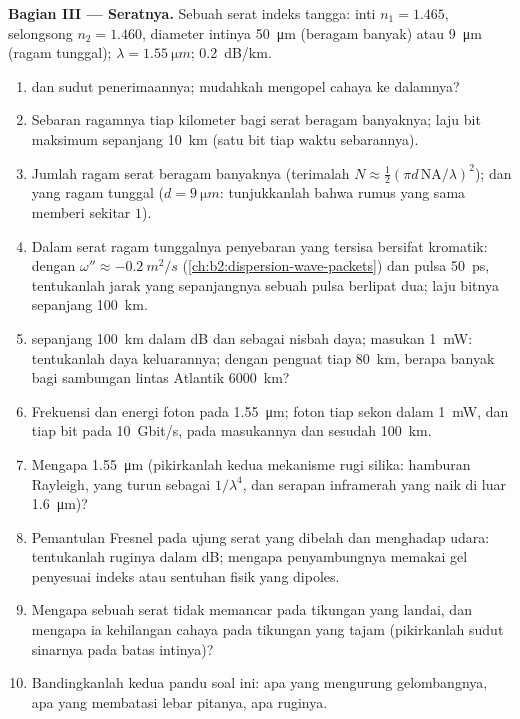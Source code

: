 \begin{problem}
\medskip
\noindent\textbf{Bagian III --- Seratnya.}
Sebuah serat indeks tangga: inti $n_1 = 1.465$, selongsong $n_2 = 1.460$, diameter
intinya \qty{50}{\micro m} (beragam banyak) atau \qty{9}{\micro m} (ragam tunggal);
$\lambda = \qty{1.55}{\micro m}$;  \qty{0.2}{dB/km}.
\begin{enumerate}[resume]
  \item {} dan sudut penerimaannya; mudahkah mengopel
        cahaya ke dalamnya?
  \item Sebaran ragamnya tiap kilometer bagi serat beragam banyaknya; laju bit
        maksimum sepanjang \qty{10}{km} (satu bit tiap waktu sebarannya).
  \item Jumlah ragam serat beragam banyaknya (terimalah $N \approx
        \tfrac12(\pi d\,\mathrm{NA}/\lambda)^2$); dan yang ragam tunggal ($d =
        \qty{9}{\micro m}$: tunjukkanlah bahwa rumus yang sama memberi sekitar $1$).
  \item Dalam serat ragam tunggalnya penyebaran yang tersisa bersifat kromatik:
        dengan $\omega'' \approx \qty{-0.2}{m^2/s}$ (\cref{ch:b2:dispersion-wave-packets})
        dan pulsa \qty{50}{ps}, tentukanlah jarak yang sepanjangnya sebuah pulsa berlipat dua;
        laju bitnya sepanjang \qty{100}{km}.
  \item {} sepanjang \qty{100}{km} dalam dB dan sebagai nisbah daya; masukan
        \qty{1}{mW}: tentukanlah daya keluarannya; dengan penguat tiap \qty{80}{km}, berapa
        banyak bagi sambungan lintas Atlantik \qty{6000}{km}?
  \item Frekuensi dan energi foton pada \qty{1.55}{\micro m}; foton tiap
        sekon dalam \qty{1}{mW}, dan tiap bit pada \qty{10}{Gbit/s}, pada masukannya
        dan sesudah \qty{100}{km}.
  \item Mengapa \qty{1.55}{\micro m} (pikirkanlah kedua mekanisme rugi
        silika: hamburan Rayleigh, yang turun sebagai $1/\lambda^4$, dan serapan
        inframerah yang naik di luar \qty{1.6}{\micro m})?
  \item Pemantulan Fresnel pada ujung serat yang dibelah dan menghadap udara: tentukanlah ruginya dalam
        dB; mengapa penyambungnya memakai gel penyesuai indeks atau sentuhan fisik
        yang dipoles.
  \item Mengapa sebuah serat tidak memancar pada tikungan yang landai, dan mengapa
        ia kehilangan cahaya pada tikungan yang tajam (pikirkanlah sudut sinarnya
        pada batas intinya)?
  \item Bandingkanlah kedua pandu soal ini: apa yang mengurung
        gelombangnya, apa yang membatasi lebar pitanya, apa ruginya.
\end{enumerate}
\end{problem}

